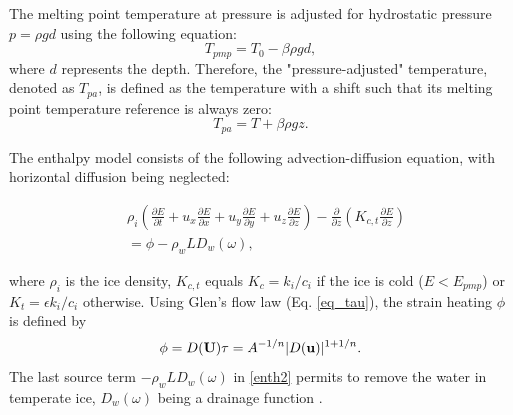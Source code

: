 \documentclass[gmd]{copernicus}
\begin{document}
The melting point temperature at pressure is adjusted for hydrostatic pressure $p = \rho g d$ using the following equation:
\begin{equation}
\label{Tpmp}
T_{pmp} = T_{0} - \beta \rho g d, 
\end{equation}
where $d$ represents the depth. Therefore, the "pressure-adjusted" temperature, 
denoted as $T_{pa}$, is defined as the temperature with a shift such that its 
melting point temperature reference is always zero:
$$ T_{pa} = T + \beta \rho g z. $$

The enthalpy model consists of the following advection-diffusion equation,
with horizontal diffusion being neglected:

\begin{align}
& \rho_i \left( \frac{\partial E}{ \partial t}
+ u_x \frac{\partial E}{ \partial x}
+ u_y \frac{\partial E}{ \partial y} 
+ u_z \frac{\partial E}{ \partial z} 
\right) 
 - \frac{\partial }{\partial z} \left(
K_{c,t} \frac{\partial E}{ \partial z} \right) \label{enth1} \\
& = \phi - \rho_w L D_w(\omega), \label{enth2} 
\end{align}

where $\rho_i$ is the ice density, $K_{c,t}$ equals 
$K_c = k_i/c_i$ if the ice is cold ($E<E_{pmp}$) or $K_t = \epsilon k_i/c_i$ otherwise. 
Using Glen's flow law (Eq. \eqref{eq_tau}), the strain heating $\phi$ is defined by 
\begin{equation}
\label{def_phi}
\phi = D({\bf U}) \tau = A^{-1/n} | D({\bf u}) |^{1+1/n}.
\end{equation}
The last source term $- \rho_w L D_w(\omega)$ in \eqref{enth2} permits to remove the water 
in temperate ice, $D_w(\omega)$ being a drainage function \citep{aschwanden2012enthalpy}.
\end{document}
